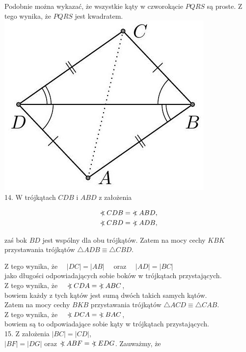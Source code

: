 \documentclass[10pt]{article}
\newcommand\Varangle{\mathop{{<\!\!\!\!\!\text{\small)}}\:}\nolimits}
\begin{document}
Podobnie można wykazać, że wszystkie kąty w czworokącie \(P Q R S\) są proste. Z tego wynika, że \(P Q R S\) jest kwadratem.\\
\includegraphics[max width=\textwidth, center]{2024_11_21_71f62bd117d375398909g-062}\\
14. W trójkątach \(C D B\) i \(A B D\) z założenia

\[
\begin{aligned}
& \Varangle C D B=\Varangle A B D, \\
& \Varangle C B D=\Varangle A D B,
\end{aligned}
\]

zaś bok \(B D\) jest wspólny dla obu trójkątów. Zatem na mocy cechy \(K B K\) przystawania trójkątów \(\triangle A D B \equiv \triangle C B D\).

Z tego wynika, że \(\quad|D C|=|A B| \quad\) oraz \(\quad|A D|=|B C|\)\\
jako długości odpowiadających sobie boków w trójkątach przystających.\\
Z tego wynika, że \(\quad \Varangle C D A=\Varangle A B C\),\\
bowiem każdy z tych kątów jest sumą dwóch takich samych kątów.\\
Zatem na mocy cechy \(B K B\) przystawania trójkątów \(\triangle A C D \equiv \triangle C A B\).\\
Z tego wynika, że \(\quad \Varangle D C A=\Varangle B A C\),\\
bowiem są to odpowiadające sobie kąty w trójkątach przystających.\\
15. Z założenia \(|B C|=|C D|\),\\
\(|B F|=|D G|\) oraz \(\Varangle A B F=\Varangle E D G\). Zauważmy, że
\end{document}
